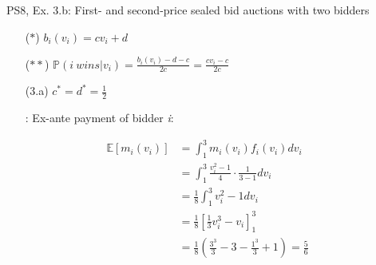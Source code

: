 \begin{frame}{PS8, Ex. 3.b: First- and second-price sealed bid auctions with two bidders}
\begin{multicols}{2}
\begin{itemize}
        \item[($*$)]  $b_i(v_i) = cv_i+d$
        \item[($**$)] $\mathbb{P}(i\ wins|v_i)=\frac{b_i(v_i)-d-c}{2c}=\frac{cv_i-c}{2c}$
        \item[(3.a)]    $c^*=d^*=\frac{1}{2}$
        \item[\nth{2}:] Ex-ante payment of bidder \textit{i}:
      \end{itemize}
      \vspace{-12pt}
      \begin{align*}
        \mathbb{E}[m_i(v_i)]&=\textstyle\int_1^3m_i(v_i)f_i(v_i)dv_i\\
                            &=\textstyle\int_1^3\frac{v_i^2-1}{4}\cdot\frac{1}{3-1}dv_i\\
                            &=\frac{1}{8}\textstyle\int_1^3v_i^2-1dv_i\\
                            &=\frac{1}{8}\left[\frac{1}{3}v_i^3-v_i\right]_1^3\\
                            &=\frac{1}{8}\left(\frac{3^3}{3}-3-\frac{1^3}{3}+1\right)=\frac{5}{6}
      \end{align*}
      \vfill\null
    \end{multicols}
\end{frame}
